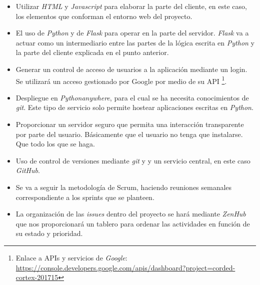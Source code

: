 \begin{itemize}
	\item Utilizar \textit{HTML} y \textit{Javascript} para elaborar la parte del cliente, en este caso, los elementos que conforman el entorno web del proyecto.
	
	\item El uso de \textit{Python} y de \textit{Flask} para operar en la parte del servidor. \textit{Flask} va a actuar como un intermediario entre las partes de la lógica escrita en \textit{Python} y la parte del cliente explicada en el punto anterior.
	
	\item Generar un control de acceso de usuarios a la aplicación mediante un login. Se utilizará un acceso gestionado por Google por medio de su API \footnote{Enlace a APIs y servicios de \textit{Google}: \url{https://console.developers.google.com/apis/dashboard?project=corded-cortex-201715}}.
	
	\item Despliegue en \textit{Pythonanywhere}, para el cual se ha necesita conocimientos de \textit{git}. Este tipo de servicio solo permite hostear aplicaciones escritas en \textit{Python}.
	
	\item Proporcionar un servidor seguro que permita una interacción transparente por parte del usuario. Básicamente que el usuario no tenga que instalarse. Que todo los que se haga.
	
	\item Uso de control de versiones mediante \textit{git} y y un servicio central, en este caso \textit{GitHub}.
	
	\item Se va a seguir la metodología de Scrum, haciendo reuniones semanales correspondiente a los sprints que se planteen. 
	
	\item La organización de las \textit{issues} dentro del proyecto se hará mediante \textit{ZenHub} que nos proporcionará un tablero para ordenar las actividades en función de su estado y prioridad.
	
\end{itemize}